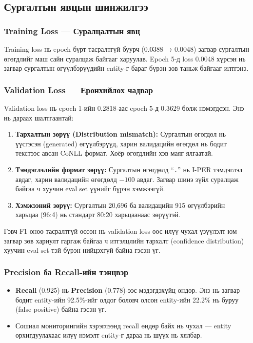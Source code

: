 \subsection{Сургалтын явцын шинжилгээ}

\subsubsection{Training Loss — Суралцалтын явц}

Training loss нь epoch бүрт тасралтгүй буурч (0.0388 → 0.0048) загвар сургалтын өгөгдлийг маш сайн суралцаж байгааг харуулав. Epoch 5-д loss 0.0048 хүрсэн нь загвар сургалтын өгүүлбэрүүдийн entity-г бараг бүрэн зөв таньж байгааг илтгэнэ.

\subsubsection{Validation Loss — Ерөнхийлөх чадвар}

Validation loss нь epoch 1-ийн 0.2818-аас epoch 5-д 0.3629 болж нэмэгдсэн. Энэ нь дараах шалтгаантай:

\begin{enumerate}
    \item \textbf{Тархалтын зөрүү (Distribution mismatch):} Сургалтын өгөгдөл нь үүсгэсэн (generated) өгүүлбэрүүд, харин валидацийн өгөгдөл нь бодит текстээс авсан CoNLL формат. Хоёр өгөгдлийн хэв маяг ялгаатай.
    \item \textbf{Тэмдэглэлийн формат зөрүү:} Сургалтын өгөгдөлд ``\texttt{.}'' нь I-PER тэмдэглэл авдаг, харин валидацийн өгөгдөлд $-100$ авдаг. Загвар шинэ зүйл суралцаж байгаа ч хуучин eval set үүнийг бүрэн хэмжээгүй.
    \item \textbf{Хэмжээний зөрүү:} Сургалтын 20,696 ба валидацийн 915 өгүүлбэрийн харьцаа (96:4) нь стандарт 80:20 харьцаанаас зөрүүтэй.
\end{enumerate}

Гэвч F1 оноо тасралтгүй өссөн нь validation loss-оос илүү чухал үзүүлэлт юм — загвар зөв хариулт гаргаж байгаа ч итгэлцлийн тархалт (confidence distribution) хуучин eval set-тэй бүрэн нийцэхгүй байна гэсэн үг.

\subsubsection{Precision ба Recall-ийн тэнцвэр}

\begin{itemize}
    \item \textbf{Recall} (0.925) нь \textbf{Precision} (0.778)-ээс мэдэгдэхүйц өндөр. Энэ нь загвар бодит entity-ийн 92.5\%-ийг олдог боловч олсон entity-ийн 22.2\% нь буруу (false positive) байна гэсэн үг.
    \item Сошиал мониторингийн хэрэглээнд recall өндөр байх нь чухал — entity орхигдуулахаас илүү нэмэлт entity-г дараа нь шүүх нь хялбар.
\end{itemize}

